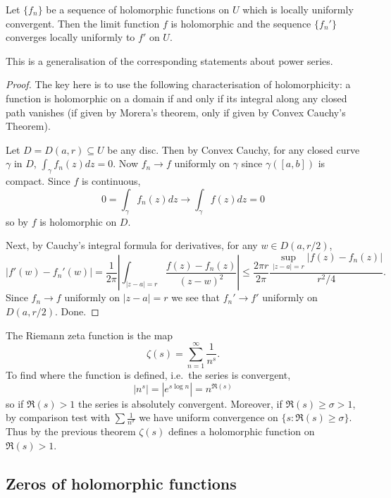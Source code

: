 \documentclass[a4paper]{article}
\begin{document}
\begin{theorem}
  Let \(\{f_n\}\) be a sequence of holomorphic functions on \(U\) which is locally uniformly convergent. Then the limit function \(f\) is holomorphic and the sequence \(\{f_n'\}\) converges locally uniformly to \(f'\) on \(U\).
\end{theorem}

This is a generalisation of the corresponding statements about power series.

\begin{proof}
  The key here is to use the following characterisation of holomorphicity: a function is holomorphic on a domain if and only if its integral along any closed path vanishes (if given by Morera's theorem, only if given by Convex Cauchy's Theorem).
  
  Let \(D = D(a, r) \subseteq U\) be any disc. Then by Convex Cauchy, for any closed curve \(\gamma\) in \(D\), \(\int_\gamma f_n(z) dz = 0\). Now \(f_n \to f\) uniformly on \(\gamma\) since \(\gamma([a, b])\) is compact. Since \(f\) is continuous,
  \[
    0 = \int_\gamma f_n(z) dz \to \int_\gamma f(z) dz = 0
  \]
  so by  \(f\) is holomorphic on \(D\).

  Next, by Cauchy's integral formula for derivatives, for any \(w \in D(a, r/2)\),
  \[
    |f'(w) - f_n'(w)|
    = \frac{1}{2\pi} \left| \int_{|z - a| = r} \frac{f(z) - f_n(z)}{(z - w)^2} \right|
    \leq \frac{2\pi r}{2\pi} \frac{\sup_{|z - a| = r} |f(z) - f_n(z)|}{r^2/4}.
  \]
  Since \(f_n \to f\) uniformly on \(|z - a| = r\) we see that \(f_n' \to f'\) uniformly on \(D(a, r/2)\). Done.
\end{proof}

\begin{eg}
  The Riemann zeta function is the map
  \[
    \zeta(s) = \sum_{n = 1}^\infty \frac{1}{n^s}.
  \]
  To find where the function is defined, i.e.\ the series is convergent,
  \[
    |n^s| = |e^{s \log n}| = n^{\Re(s)}
  \]
  so if \(\Re(s) > 1\) the series is absolutely convergent. Moreover, if \(\Re(s) \geq \sigma > 1\), by comparison test with \(\sum \frac{1}{n^\sigma}\) we have uniform convergence on \(\{s: \Re(s) \geq \sigma\}\). Thus by the previous theorem \(\zeta(s)\) defines a holomorphic function on \(\Re(s) > 1\).
\end{eg}

\subsection{Zeros of holomorphic functions}
\end{document}
